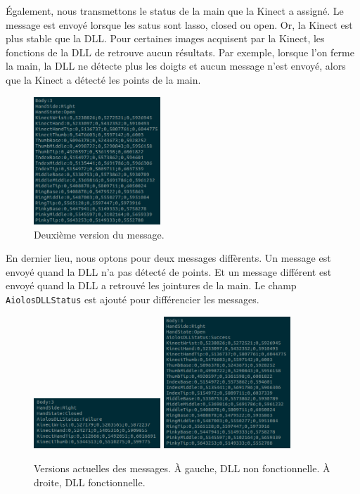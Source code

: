 Également, nous transmettons le status de la main que la Kinect a 
assigné. Le message est envoyé lorsque les satus sont lasso, closed ou 
open. Or, la Kinect est plus stable que la DLL. Pour certaines images 
acquisent par la Kinect, les fonctions de la DLL de retrouve aucun 
résultats. Par exemple, lorsque l'on ferme la main, la DLL ne détecte 
plus les doigts et aucun message n'est envoyé, alors que la Kinect a 
détecté les points de la main.

\begin{figure}[H]
  \begin{center}
    \includegraphics[width=180px]{images/socket_v2.png}
    \caption{Deuxième version du message.}
  \end{center}
\end{figure}

En dernier lieu, nous optons pour deux messages diffèrents. Un message 
est envoyé quand la DLL n'a pas détecté de points. Et un message 
différent est envoyé quand la DLL a retrouvé les jointures de la main. 
Le champ \texttt{AiolosDLLStatus} est ajouté pour différencier les 
messages.

\begin{figure}[H]
  \begin{center}
    \includegraphics[width=180px]{images/socket_v3-2.png}
    \includegraphics[width=180px]{images/socket_v3-1.png}
    \caption{Versions actuelles des messages. À gauche, DLL non fonctionnelle. À droite, DLL fonctionnelle.}
  \end{center}
\end{figure}

